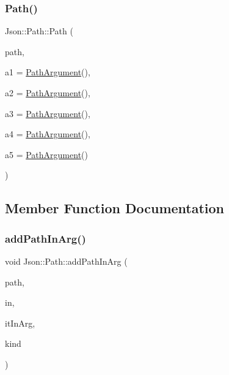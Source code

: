 \subsubsection{\texorpdfstring{Path()}{Path()}\hspace{0.1cm}{\footnotesize\ttfamily [2/2]}}
{\footnotesize\ttfamily Json\+::\+Path\+::\+Path (\begin{DoxyParamCaption}\item[{const \hyperlink{config_8h_a1e723f95759de062585bc4a8fd3fa4be}{J\+S\+O\+N\+C\+P\+P\+\_\+\+S\+T\+R\+I\+NG} \&}]{path,  }\item[{const \hyperlink{class_json_1_1_path_argument}{Path\+Argument} \&}]{a1 = {\ttfamily \hyperlink{class_json_1_1_path_argument}{Path\+Argument}()},  }\item[{const \hyperlink{class_json_1_1_path_argument}{Path\+Argument} \&}]{a2 = {\ttfamily \hyperlink{class_json_1_1_path_argument}{Path\+Argument}()},  }\item[{const \hyperlink{class_json_1_1_path_argument}{Path\+Argument} \&}]{a3 = {\ttfamily \hyperlink{class_json_1_1_path_argument}{Path\+Argument}()},  }\item[{const \hyperlink{class_json_1_1_path_argument}{Path\+Argument} \&}]{a4 = {\ttfamily \hyperlink{class_json_1_1_path_argument}{Path\+Argument}()},  }\item[{const \hyperlink{class_json_1_1_path_argument}{Path\+Argument} \&}]{a5 = {\ttfamily \hyperlink{class_json_1_1_path_argument}{Path\+Argument}()} }\end{DoxyParamCaption})}



\subsection{Member Function Documentation}
\hypertarget{class_json_1_1_path_ae65717a5fbc35b1336cbf783b15aad2e}{}\label{class_json_1_1_path_ae65717a5fbc35b1336cbf783b15aad2e} 
\subsubsection{\texorpdfstring{add\+Path\+In\+Arg()}{addPathInArg()}\hspace{0.1cm}{\footnotesize\ttfamily [1/2]}}
{\footnotesize\ttfamily void Json\+::\+Path\+::add\+Path\+In\+Arg (\begin{DoxyParamCaption}\item[{const \hyperlink{config_8h_a1e723f95759de062585bc4a8fd3fa4be}{J\+S\+O\+N\+C\+P\+P\+\_\+\+S\+T\+R\+I\+NG} \&}]{path,  }\item[{const \hyperlink{class_json_1_1_path_ab29d7b2fc896c7d3c5ed4609af3a3f23}{In\+Args} \&}]{in,  }\item[{In\+Args\+::const\+\_\+iterator \&}]{it\+In\+Arg,  }\item[{\hyperlink{class_json_1_1_path_argument_a2420bbad778573c147e578701b84d9b9}{Path\+Argument\+::\+Kind}}]{kind }\end{DoxyParamCaption})\hspace{0.3cm}{\ttfamily [private]}}


